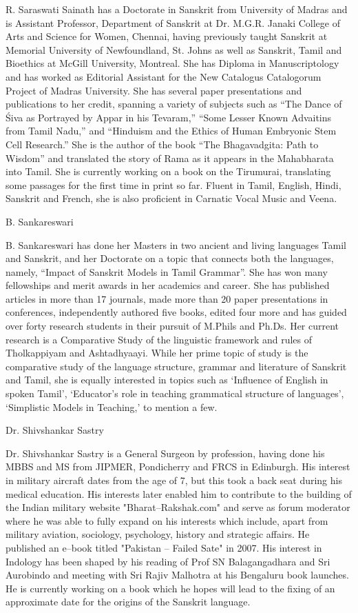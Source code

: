 R. Saraswati Sainath has a Doctorate in Sanskrit from University of Madras and is Assistant Professor, Department of Sanskrit at Dr. M.G.R. Janaki College of Arts and Science for Women, Chennai, having previously taught Sanskrit at Memorial University of Newfoundland, St. Johns as well as Sanskrit, Tamil and Bioethics at McGill University, Montreal. She has Diploma in Manuscriptology and has worked as Editorial Assistant for the New Catalogus Catalogorum Project of Madras University. She has several paper presentations and publications to her credit, spanning a variety of subjects such as “The Dance of Śiva as Portrayed by Appar in his Tevaram,” “Some Lesser Known Advaitins from Tamil Nadu,” and “Hinduism and the Ethics of Human Embryonic Stem Cell Research.” She is the author of the book “The Bhagavadgita: Path to Wisdom” and translated the story of Rama as it appears in the Mahabharata into Tamil. She is currently working on a book on the Tirumurai, translating some passages for the first time in print so far. Fluent in Tamil, English, Hindi, Sanskrit and French, she is also proficient in Carnatic Vocal Music and Veena.

B. Sankareswari

B. Sankareswari has done her Masters in two ancient and living languages Tamil and Sanskrit, and her Doctorate on a topic that connects both the languages, namely, “Impact of Sanskrit Models in Tamil Grammar”. She has won many fellowships and merit awards in her academics and career. She has published articles in more than 17 journals, made more than 20 paper presentations in conferences, independently authored five books, edited four more and has guided over forty research students in their pursuit of M.Phils and Ph.Ds. Her current research is a Comparative Study of the linguistic framework and rules of Tholkappiyam and Ashtadhyaayi. While her prime topic of study is the comparative study of the language structure, grammar and literature of Sanskrit and Tamil, she is equally interested in topics such as ‘Influence of English in spoken Tamil’, ‘Educator’s role in teaching grammatical structure of languages’, ‘Simplistic Models in Teaching,’ to mention a few.

Dr. Shivshankar Sastry

Dr. Shivshankar Sastry is a General Surgeon by profession, having done his MBBS and MS from JIPMER, Pondicherry and FRCS in Edinburgh. His interest in military aircraft dates from the age of 7, but this took a back seat during his medical education. His interests later enabled him to contribute to the building of the Indian military website "Bharat–Rakshak.com" and serve as forum moderator where he was able to fully expand on his interests which include, apart from military aviation, sociology, psychology, history and strategic affairs. He published an e–book titled "Pakistan – Failed Sate" in 2007. His interest in Indology has been shaped by his reading of Prof SN Balagangadhara and Sri Aurobindo and meeting with Sri Rajiv Malhotra at his Bengaluru book launches. He is currently working on a book which he hopes will lead to the fixing of an approximate date for the origins of the Sanskrit language.

